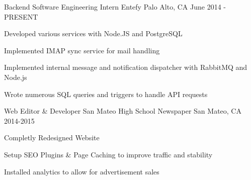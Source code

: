 \begin{cventries}
  \cventry
    {Backend Software Engineering Intern}
    {Entefy}
    {Palo Alto, CA}
    {June 2014 - PRESENT}
    {
      \begin{cvitems}
        \item {Developed various services with Node.JS and PostgreSQL}
        \item {Implemented IMAP sync service for mail handling}
        \item {Implemented internal message and notification dispatcher with RabbitMQ and Node.js}
        \item {Wrote numerous SQL queries and triggers to handle API requests}
      \end{cvitems}
    }
  \cventry
    {Web Editor \& Developer}
    {San Mateo High School Newspaper}
    {San Mateo, CA}
    {2014-2015}
    {
      \begin{cvitems}
        \item {Completly Redesigned Website}
        \item {Setup SEO Plugins \& Page Caching to improve traffic and stability}
        \item {Installed analytics to allow for advertisement sales}
      \end{cvitems}
    }
\end{cventries}
